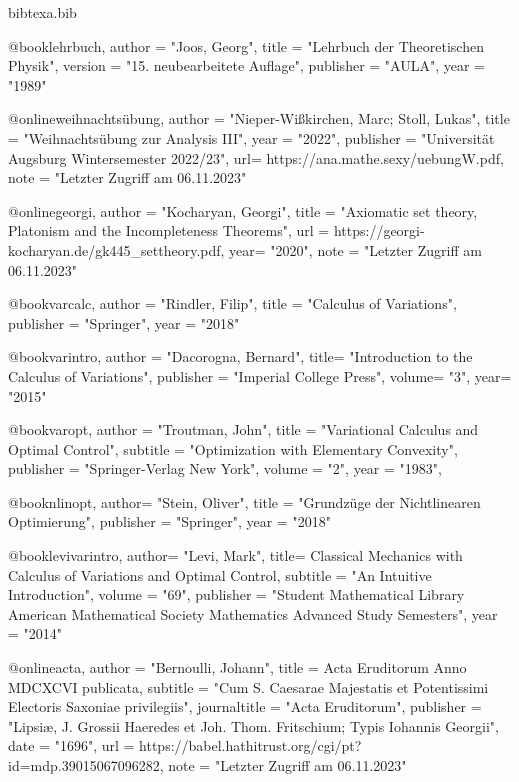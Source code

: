 \begin{filecontents*}{bibtexa.bib}

@book{lehrbuch,
author = "{{J}oos, {G}eorg}",
title = "{{L}ehrbuch der {T}heoretischen {P}hysik}",
version = "{15. neubearbeitete {A}uflage}",
publisher = "{AULA}",
year = "{1989}"
}

@online{weihnachtsübung,
author = "{{Nieper-Wißkirchen}, Marc; Stoll, {L}ukas}",
title = "{{W}eihnachtsübung zur {A}nalysis {I}{I}{I}}", 
year = "2022",
publisher = "{{U}niversität {A}ugsburg {W}intersemester 2022/23}",
url= {https://ana.mathe.sexy/uebungW.pdf},
note = "{{L}etzter {Z}ugriff am 06.11.2023}"
}

@online{georgi,
    author = "{Kocharyan, {G}eorgi}",
    title = "{{A}xiomatic set theory, {P}latonism and the {I}ncompleteness {T}heorems}",
    url = {https://georgi-kocharyan.de/gk445_settheory.pdf},
    year= "2020",
    note = "{{L}etzter {Z}ugriff am 06.11.2023}"
}

@book{varcalc,
author = "{Rindler, {F}ilip}",
title = "{{C}alculus of {V}ariations}",
publisher = "{{S}pringer}",
year = "{2018}"
}

@book{varintro,
author = "{Dacorogna, {B}ernard}",
title= "{{I}ntroduction to the {C}alculus of {V}ariations}",
publisher = "{{I}mperial {C}ollege {P}ress}", 
volume= "{3}",
year= "2015"
}

@book{varopt,
author = "{{T}routman, {J}ohn}",
title = "{{V}ariational {C}alculus and {O}ptimal {C}ontrol}",
subtitle = "{{O}ptimization with {E}lementary {C}onvexity}",
publisher = "{{S}pringer-{V}erlag {N}ew {Y}ork}", 
volume = "{2}",
year = "1983",
}

@book{nlinopt,
author= "{{S}tein, {O}liver}",
title = "{{G}rundzüge der {N}ichtlinearen {O}ptimierung}",
publisher = "{Springer}",
year = "2018"
}

@book{levivarintro,
author= "{{L}evi, {M}ark}",
title= {{C}lassical {M}echanics with {C}alculus of {V}ariations and {O}ptimal {C}ontrol},
subtitle = "{{A}n {I}ntuitive {I}ntroduction}",
volume = "{69}", 
publisher = "{{S}tudent {M}athematical {L}ibrary} {{A}merican {M}athematical {S}ociety {M}athematics {A}dvanced {S}tudy {S}emesters}",
year = "2014"
}

@online{acta,
author = "{{B}ernoulli, {J}ohann}",
title = {{A}cta {E}ruditorum {A}nno {M}{D}{C}{X}{C}{V}{I} publicata},
subtitle = "{{C}um {S}. {C}aesarae {M}ajestatis et {P}otentissimi {E}lectoris {S}axoniae privilegiis}",
journaltitle = "{{A}cta {E}ruditorum}",
publisher = "{{L}ipsiæ, {J}. {G}rossii {H}aeredes et {J}oh. {T}hom. {F}ritschium; Typis {I}ohannis {G}eorgii}",
date = "1696",
url = {https://babel.hathitrust.org/cgi/pt?id=mdp.39015067096282},
note = "{{L}etzter {Z}ugriff am 06.11.2023}"
}
\end{filecontents*}

